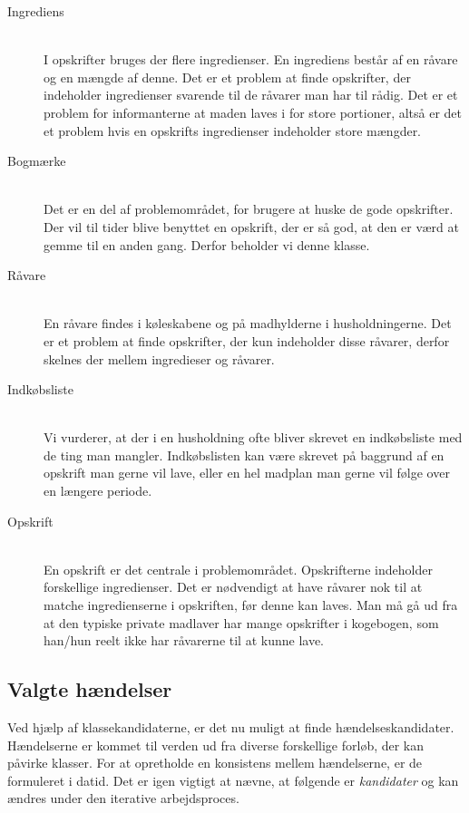 \begin{description}
\item[Ingrediens] \hfill \\ 
I opskrifter bruges der flere ingredienser. En ingrediens består af en råvare og en mængde af denne. Det er et problem at finde opskrifter, der indeholder ingredienser svarende til de råvarer man har til rådig. Det er et problem for informanterne at maden laves i for store portioner, altså er det et problem hvis en opskrifts ingredienser indeholder store mængder.

\item[Bogmærke] \hfill \\
Det er en del af problemområdet, for brugere at huske de gode opskrifter. Der vil til tider blive benyttet en opskrift, der er så god, at den er værd at gemme til en anden gang. Derfor beholder vi denne klasse.

\item[Råvare] \hfill \\
En råvare findes i køleskabene og på madhylderne i husholdningerne. Det er et problem at finde opskrifter, der kun indeholder disse råvarer, derfor skelnes der mellem ingredieser og råvarer.

\item[Indkøbsliste] \hfill \\
Vi vurderer, at der i en husholdning ofte bliver skrevet en indkøbsliste med de ting man mangler. Indkøbslisten kan være skrevet på baggrund af en opskrift man gerne vil lave, eller en hel madplan man gerne vil følge over en længere periode.

\item[Opskrift] \hfill \\
En opskrift er det centrale i problemområdet. Opskrifterne indeholder forskellige ingredienser. Det er nødvendigt at have råvarer nok til at matche ingredienserne i opskriften, før denne kan laves. Man må gå ud fra at den typiske private madlaver har mange opskrifter i kogebogen, som han/hun reelt ikke har råvarerne til at kunne lave.
\end{description}

\subsection{Valgte hændelser}
\label{sec:haendelser}
Ved hjælp af klassekandidaterne, er det nu muligt at finde hændelseskandidater. Hændelserne er kommet til verden ud fra diverse forskellige forløb, der kan påvirke klasser. For at opretholde en konsistens mellem hændelserne, er de formuleret i datid. Det er igen vigtigt at nævne, at følgende er \emph{kandidater} og kan ændres under den iterative arbejdsproces. 

